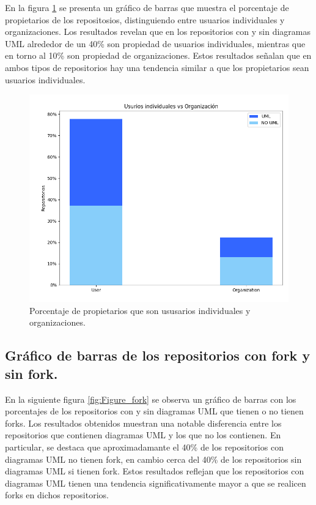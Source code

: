 \documentclass[a4paper, 12pt]{book}
\begin{document}
En la figura \ref{fig:Figure_typeDeveloper} se presenta un gráfico de barras que muestra el porcentaje de propietarios de los repositosios, distinguiendo entre usuarios individuales y organizaciones. 
Los resultados revelan que en los repositorios con y sin diagramas UML alrededor de un 40\% son propiedad de usuarios individuales, mientras que en torno al 10\% son propiedad de organizaciones.
Estos resultados señalan que en ambos tipos de repositorios hay una tendencia similar a que los propietarios sean usuarios individuales.


\begin{figure}
  \centering
  \includegraphics[width=12cm, keepaspectratio]{img/Figure_typeDeveloper.png}
  \caption{Porcentaje de propietarios que son ususarios individuales y organizaciones.}\label{fig:Figure_typeDeveloper}
\end{figure}


\subsection{Gráfico de barras de los repositorios con fork y sin fork.}
\label{sec:Gráfico de barras de los repositorios con fork y sin forks}
En la siguiente figura \ref{fig:Figure_fork} se observa un gráfico de barras con los porcentajes de  los repositorios con y sin diagramas UML que tienen o no tienen forks.
Los resultados obtenidos muestran una notable disferencia entre los repositorios que contienen diagramas UML y los que no los contienen.
En particular, se destaca que aproximadamante el 40\% de los repositorios con diagramas UML no tienen fork, en cambio cerca del 40\% de los repositorios sin diagramas UML si tienen fork.
Estos resultados reflejan que los repositorios con diagramas UML tienen una tendencia significativamente mayor a que se realicen forks en dichos repositorios.
\end{document}
